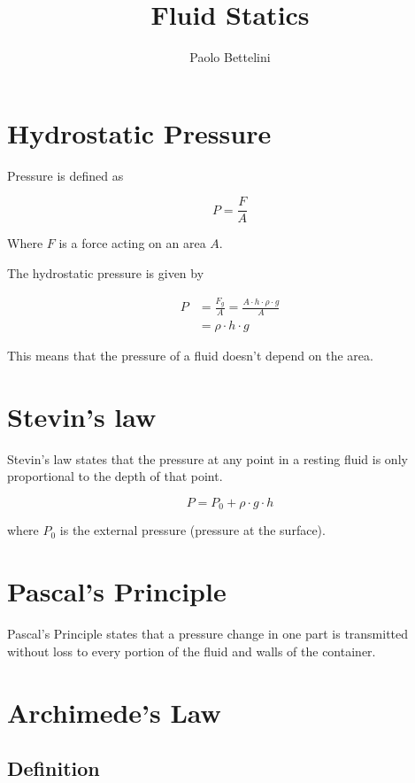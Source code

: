 \documentclass[a4paper]{article}
\title{Fluid Statics}
\author{Paolo Bettelini}
\date{}
\begin{document}
\maketitle
\tableofcontents
\pagebreak

\section{Hydrostatic Pressure}

Pressure is defined as 

\[
    P = \frac{F}{A}
\]

Where \(F\) is a force acting on an area \(A\).

The hydrostatic pressure is given by

\begin{align*}
    P &= \frac{F_g}{A} = \frac{A \cdot h \cdot \rho \cdot g}{A} \\
    &= \rho \cdot h \cdot g
\end{align*}

This means that the pressure of a fluid doesn't depend
on the area.

\section{Stevin's law}

Stevin's law states that the pressure at any point
in a resting fluid is only proportional to the depth of that point.

\[
    P = P_0 + \rho \cdot g \cdot h
\]

where \(P_0\) is the external pressure (pressure at the surface).

\section{Pascal's Principle}

Pascal's Principle states that a pressure change in one part
is transmitted without loss to every portion of the fluid and walls of the container.

\section{Archimede's Law}

\subsection{Definition}
\end{document}

